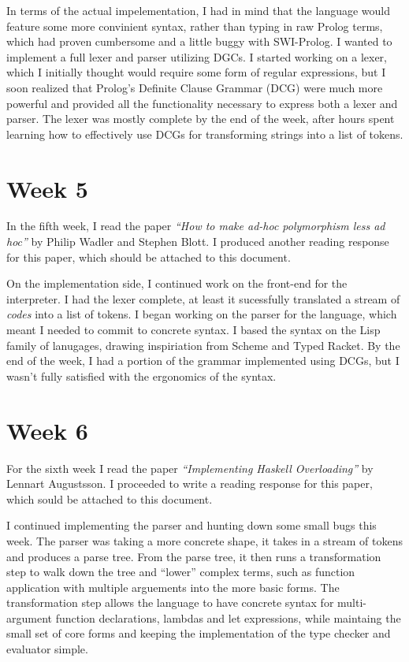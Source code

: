 \documentclass[11pt,a4paper]{article}
\begin{document}
In terms of the actual impelementation, I had in mind that the language would
feature some more convinient syntax, rather than typing in raw Prolog terms,
which had proven cumbersome and a little buggy with SWI-Prolog. I wanted to
implement a full lexer and parser utilizing DGCs. I started working on a lexer,
which I initially thought would require some form of regular expressions, but I
soon realized that Prolog's Definite Clause Grammar (DCG) were much more powerful
and provided all the functionality necessary to express both a lexer and parser.
The lexer was mostly complete by the end of the week, after hours spent learning
how to effectively use DCGs for transforming strings into a list of tokens.


\section*{Week 5}

In the fifth week, I read the paper \textit{``How to make ad-hoc polymorphism
less ad hoc''} by Philip Wadler and Stephen Blott. I produced another reading
response for this paper, which should be attached to this document.

On the implementation side, I continued work on the front-end for the interpreter.
I had the lexer complete, at least it sucessfully translated a stream of
\textit{codes} into a list of tokens. I began working on the parser for the language,
which meant I needed to commit to concrete syntax. I based the syntax on the Lisp
family of lanugages, drawing inspiriation from Scheme and Typed Racket. By the
end of the week, I had a portion of the grammar implemented using DCGs, but I wasn't
fully satisfied with the ergonomics of the syntax.


\section*{Week 6}

For the sixth week I read the paper \textit{``Implementing Haskell Overloading''}
by Lennart Augustsson. I proceeded to write a reading response for this paper,
which sould be attached to this document.

I continued implementing the parser and hunting down some small bugs this week.
The parser was taking a more concrete shape, it takes in a stream of tokens and
produces a parse tree. From the parse tree, it then runs a transformation step
to walk down the tree and ``lower'' complex terms, such as function application
with multiple arguements into the more basic forms. The transformation step
allows the language to have concrete syntax for multi-argument function
declarations, lambdas and let expressions, while maintaing the small set of core
forms and keeping the implementation of the type checker and evaluator simple.
\end{document}
